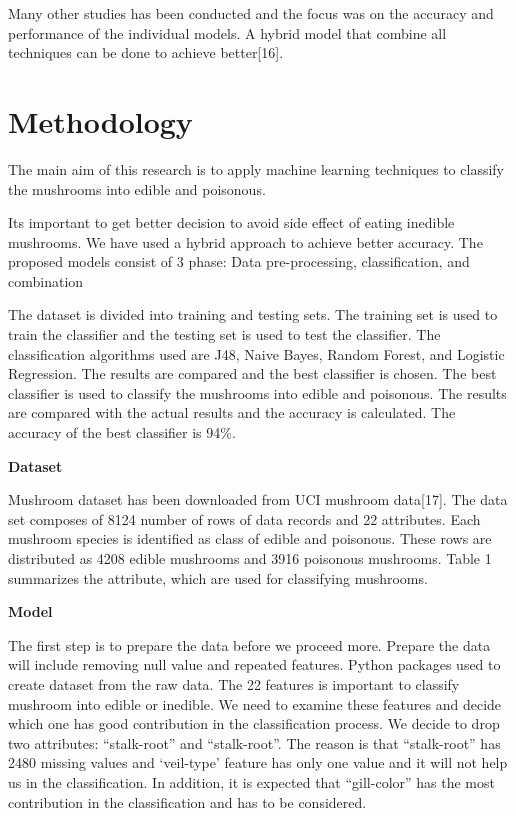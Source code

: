 \documentclass[a4paper,11pt]{article}
\begin{document}
            Many other studies has been conducted and the focus was on the accuracy and performance of the individual models. A hybrid model that combine all techniques can be done to achieve better[16].

            \section {Methodology}

            The main aim of this research is to apply machine learning techniques to classify the mushrooms into edible and poisonous. 
            
            Its important to get better decision to avoid side effect of eating inedible mushrooms. We have used a hybrid approach to achieve better accuracy. The proposed models consist of 3 phase: Data pre-processing, classification, and combination

            The dataset is divided into training and testing sets. The training set is used to train the classifier and the testing set is used to test the classifier. The classification algorithms used are J48, Naive Bayes, Random Forest, and Logistic Regression. The results are compared and the best classifier is chosen. The best classifier is used to classify the mushrooms into edible and poisonous. The results are compared with the actual results and the accuracy is calculated. The accuracy of the best classifier is 94\%.

            \textbf {Dataset}

            Mushroom dataset has been downloaded from  UCI mushroom data[17].  The data set composes of 8124 number of rows of data records and 22 attributes. Each mushroom species is identified as class of edible and poisonous. These rows are distributed as 4208 edible mushrooms and 3916 poisonous mushrooms. Table 1 summarizes the attribute, which are used for classifying mushrooms. 

            \textbf {Model}

            The first step is to prepare the data before we proceed more. Prepare the data will include removing null value and repeated features. Python packages used to create dataset from the raw data.  The 22 features is important to classify mushroom into edible or inedible. We need to examine these features and decide which one has good contribution in the classification process.  We decide to drop two attributes: “stalk-root” and “stalk-root”. The reason is that “stalk-root” has 2480 missing values and `veil-type' feature has only one value and it will not help us in the classification. In addition, it is expected that “gill-color” has the most contribution in the classification and has to be considered.
\end{document}
